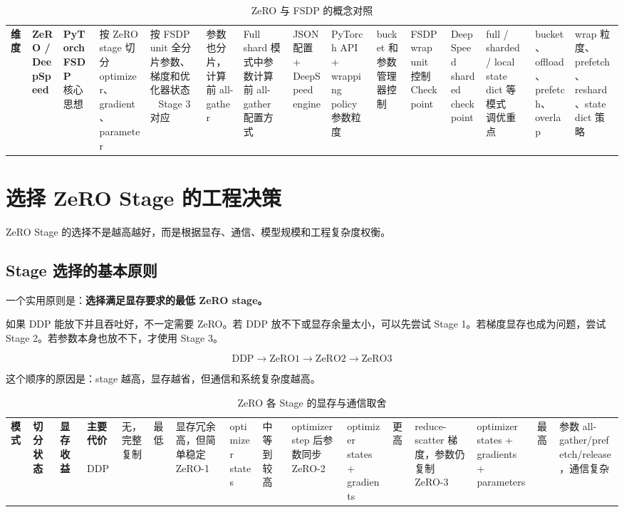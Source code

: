 \begin{table}[H]
\centering
\small
\caption{ZeRO 与 FSDP 的概念对照}
\label{tab:zero-fsdp-comparison}
\begin{tabular}{p{}p{}p{}}
\toprule
\textbf{维度} & \textbf{ZeRO / DeepSpeed} & \textbf{PyTorch FSDP} \
\midrule
核心思想
& 按 ZeRO stage 切分 optimizer、gradient、parameter
& 按 FSDP unit 全分片参数、梯度和优化器状态 \
\midrule
Stage 3 对应
& 参数也分片，计算前 all-gather
& Full shard 模式中参数计算前 all-gather \
\midrule
配置方式
& JSON 配置 + DeepSpeed engine
& PyTorch API + wrapping policy \
\midrule
参数粒度
& bucket 和参数管理器控制
& FSDP wrap unit 控制 \
\midrule
Checkpoint
& DeepSpeed sharded checkpoint
& full / sharded / local state dict 等模式 \
\midrule
调优重点
& bucket、offload、prefetch、overlap
& wrap 粒度、prefetch、reshard、state dict 策略 \
\bottomrule
\end{tabular}
\end{table}

\section{选择 ZeRO Stage 的工程决策}
\label{sec:choosing-zero-stage}

ZeRO Stage 的选择不是越高越好，而是根据显存、通信、模型规模和工程复杂度权衡。

\subsection{Stage 选择的基本原则}
\label{subsec:zero-stage-choice-principles}

一个实用原则是：\textbf{选择满足显存要求的最低 ZeRO stage。}

如果 DDP 能放下并且吞吐好，不一定需要 ZeRO。若 DDP 放不下或显存余量太小，可以先尝试 Stage 1。若梯度显存也成为问题，尝试 Stage 2。若参数本身也放不下，才使用 Stage 3。

\[
\text{DDP}
\rightarrow
\text{ZeRO1}
\rightarrow
\text{ZeRO2}
\rightarrow
\text{ZeRO3}
\]

这个顺序的原因是：stage 越高，显存越省，但通信和系统复杂度越高。

\begin{table}[H]
\centering
\small
\caption{ZeRO 各 Stage 的显存与通信取舍}
\label{tab:zero-stage-tradeoffs}
\begin{tabular}{p{0.16\textwidth}p{}p{}p{}}
\toprule
\textbf{模式} & \textbf{切分状态} & \textbf{显存收益} & \textbf{主要代价} \
\midrule
DDP
& 无，完整复制
& 最低
& 显存冗余高，但简单稳定 \
\midrule
ZeRO-1
& optimizer states
& 中等到较高
& optimizer step 后参数同步 \
\midrule
ZeRO-2
& optimizer states + gradients
& 更高
& reduce-scatter 梯度，参数仍复制 \
\midrule
ZeRO-3
& optimizer states + gradients + parameters
& 最高
& 参数 all-gather/prefetch/release，通信复杂 \
\bottomrule
\end{tabular}
\end{table}

